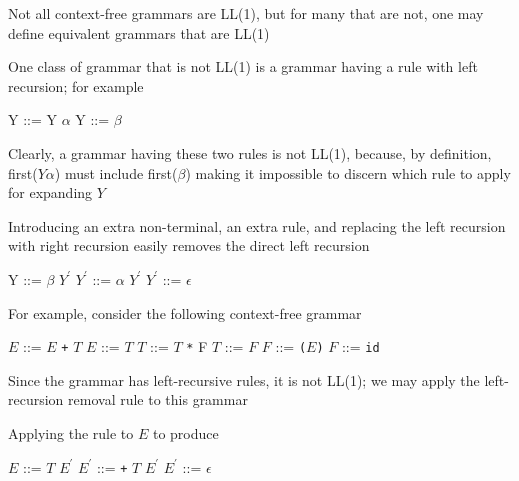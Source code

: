\documentclass[8pt,a4paper,compress]{beamer}
\newcommand{\mm}[1]{$#1$}
\newcommand{\expo}[2]{$#1^{#2}$}
\newenvironment{spaced}
{
\smallskip
\hspace{.5cm}
\begin{minipage}[c]{\textwidth}
}
{
\end{minipage}
\smallskip
}
\begin{document}
\begin{frame}[fragile]
\pause

Not all context-free grammars are LL(1), but for many that are not, one may define equivalent grammars that are LL(1)

\pause
\bigskip

One class of grammar that is not LL(1) is a grammar having a rule with left recursion; for example 

\text{ }
\begin{spaced}
\begin{production}
Y ::= Y \mm{\alpha}
Y ::= \mm{\beta}
\end{production}
\end{spaced}

\pause

Clearly, a grammar having these two rules is not LL(1), because, by definition, first($Y \alpha$) must include first($\beta$) making it impossible to discern which rule to apply for expanding $Y$

\pause
\bigskip

Introducing an extra non-terminal, an extra rule, and replacing the left recursion with right recursion easily removes the direct left recursion

\text{ }
\begin{spaced}
\begin{production}
Y  ::= \mm{\beta} \expo{Y}{\prime}
\expo{Y}{\prime} ::= \mm{\alpha} \expo{Y}{\prime}
\expo{Y}{\prime} ::= \mm{\epsilon}
\end{production}
\end{spaced}
\end{frame}

\begin{frame}[fragile]
\pause

For example, consider the following context-free grammar

\text{ }
\begin{spaced}
\begin{production}
\mm{E} ::= \mm{E} \lstinline{+} \mm{T}
\mm{E} ::= \mm{T}
\mm{T} ::= \mm{T} \lstinline{*} {F}
\mm{T} ::= \mm{F}
\mm{F} ::= \lstinline{(}\mm{E}\lstinline{)}
\mm{F} ::= \lstinline{id}
\end{production}
\end{spaced}

\pause

Since the grammar has left-recursive rules, it is not LL(1); we may apply the left-recursion removal rule to this grammar

\pause
\bigskip

Applying the rule to $E$ to produce

\text{ }
\begin{spaced}
\begin{production}
\mm{E}  ::= \mm{T} \expo{E}{\prime}
\expo{E}{\prime} ::= \lstinline{+} \mm{T} \expo{E}{\prime}
\expo{E}{\prime} ::= \mm{\epsilon}
\end{production}
\end{spaced}
\end{frame}
\end{document}
